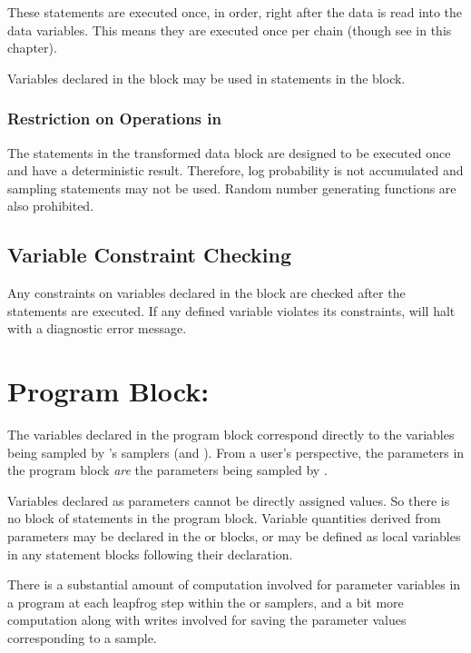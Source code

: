 These statements are executed once, in order, right after the data is
read into the data variables.  This means they are executed once per
chain (though see  in this chapter).

Variables declared in the  block may be used in statements
in the  block.

\subsubsection{Restriction on Operations in }

The statements in the transformed data block are designed to be
executed once and have a deterministic result.  Therefore, log
probability is not accumulated and sampling statements may not be
used.  Random number generating functions are also prohibited.

\subsection{Variable Constraint Checking}

Any constraints on variables declared in the 
block are checked after the statements are executed.  If any defined
variable violates its constraints, \Stan will halt with a diagnostic
error message.


\section{Program Block: }

The variables declared in the  program block
correspond directly to the variables being sampled by \Stan's samplers
(\HMC and \NUTS).  From a user's perspective, the parameters in the
program block \emph{are} the parameters being sampled by \Stan.  

Variables declared as parameters cannot be directly assigned values.
So there is no block of statements in the  program
block.  Variable quantities derived from parameters may be declared in
the  or  blocks,
or may be defined as local variables in any statement blocks following
their declaration.

There is a substantial amount of computation involved for parameter
variables in a \Stan program at each leapfrog step within the
\HMC or \NUTS samplers, and a bit more computation along with writes
involved for saving the parameter values corresponding to a sample.

